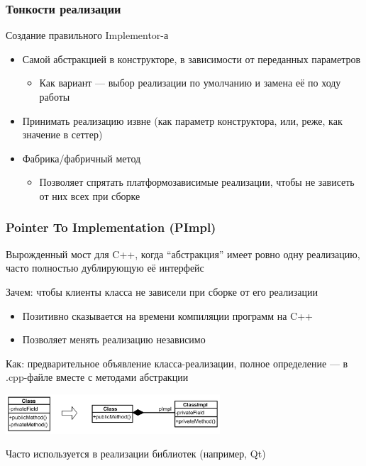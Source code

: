 \documentclass{../cscslides}
\begin{document}
    \begin{frame}
        \frametitle{Тонкости реализации}
        Создание правильного Implementor-а
        \begin{itemize}
            \item Самой абстракцией в конструкторе, в зависимости от переданных параметров
            \begin{itemize}
                \item Как вариант --- выбор реализации по умолчанию и замена её по ходу работы
            \end{itemize}
            \item Принимать реализацию извне (как параметр конструктора, или, реже, как значение в сеттер)
            \item Фабрика/фабричный метод
            \begin{itemize}
                \item Позволяет спрятать платформозависимые реализации, чтобы не зависеть от них всех при сборке
            \end{itemize}
        \end{itemize}
    \end{frame}

    \begin{frame}
        \frametitle{Pointer To Implementation (PImpl)}
        Вырожденный мост для C++, когда ``абстракция'' имеет ровно одну реализацию, часто полностью дублирующую её интерфейс

        Зачем: чтобы клиенты класса не зависели при сборке от его реализации

        \begin{itemize}
            \item Позитивно сказывается на времени компиляции программ на C++
            \item Позволяет менять реализацию независимо
        \end{itemize}

        Как: предварительное объявление класса-реализации, полное определение --- в .cpp-файле вместе с методами абстракции

        \begin{center}
            \includegraphics[width=0.6\textwidth]{pImpl.png}
        \end{center}

        Часто используется в реализации библиотек (например, Qt)
    \end{frame}
\end{document}
